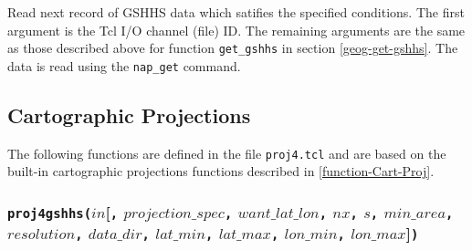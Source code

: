 Read next record of GSHHS data which satifies the specified conditions.
The first argument is the Tcl I/O channel (file) ID.
The remaining arguments are the same as those described above for function \texttt{get\_gshhs} in
section \ref{geog-get-gshhs}.
The data is read using the \texttt{nap\_get} command.

\subsection{Cartographic Projections}
    \label{geog-Cartographic}

The following functions are defined in the file \texttt{proj4.tcl}
and are based on the built-in cartographic projections functions described in
\ref{function-Cart-Proj}.

\subsubsection{\texttt{proj4gshhs(}$\mathit{in}$[\texttt{,}
$\mathit{projection\_spec}$\texttt{,}
$\mathit{want\_lat\_lon}$\texttt{,}
$\mathit{nx}$\texttt{,}
$\mathit{s}$\texttt{,}
$\mathit{min\_area}$\texttt{,}
$\mathit{resolution}$\texttt{,}
$\mathit{data\_dir}$\texttt{,}
$\mathit{lat\_min}$\texttt{,}
$\mathit{lat\_max}$\texttt{,}
$\mathit{lon\_min}$\texttt{,}
$\mathit{lon\_max}$]\texttt{)}}
    \label{geog-proj4gshhs}


